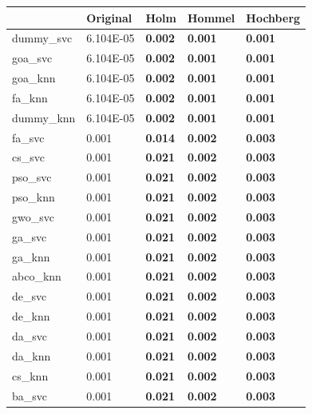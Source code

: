 \begin{table}[htb]
    \centering
    \begin{tabular}{lllll}
        \toprule
        {}         & Original  & Holm           & Hommel         & Hochberg       \\
        \midrule
        dummy\_svc & 6.104E-05 & \textbf{0.002} & \textbf{0.001} & \textbf{0.001} \\
        goa\_svc   & 6.104E-05 & \textbf{0.002} & \textbf{0.001} & \textbf{0.001} \\
        goa\_knn   & 6.104E-05 & \textbf{0.002} & \textbf{0.001} & \textbf{0.001} \\
        fa\_knn    & 6.104E-05 & \textbf{0.002} & \textbf{0.001} & \textbf{0.001} \\
        dummy\_knn & 6.104E-05 & \textbf{0.002} & \textbf{0.001} & \textbf{0.001} \\
        fa\_svc    & 0.001     & \textbf{0.014} & \textbf{0.002} & \textbf{0.003} \\
        cs\_svc    & 0.001     & \textbf{0.021} & \textbf{0.002} & \textbf{0.003} \\
        pso\_svc   & 0.001     & \textbf{0.021} & \textbf{0.002} & \textbf{0.003} \\
        pso\_knn   & 0.001     & \textbf{0.021} & \textbf{0.002} & \textbf{0.003} \\
        gwo\_svc   & 0.001     & \textbf{0.021} & \textbf{0.002} & \textbf{0.003} \\
        ga\_svc    & 0.001     & \textbf{0.021} & \textbf{0.002} & \textbf{0.003} \\
        ga\_knn    & 0.001     & \textbf{0.021} & \textbf{0.002} & \textbf{0.003} \\
        abco\_knn  & 0.001     & \textbf{0.021} & \textbf{0.002} & \textbf{0.003} \\
        de\_svc    & 0.001     & \textbf{0.021} & \textbf{0.002} & \textbf{0.003} \\
        de\_knn    & 0.001     & \textbf{0.021} & \textbf{0.002} & \textbf{0.003} \\
        da\_svc    & 0.001     & \textbf{0.021} & \textbf{0.002} & \textbf{0.003} \\
        da\_knn    & 0.001     & \textbf{0.021} & \textbf{0.002} & \textbf{0.003} \\
        cs\_knn    & 0.001     & \textbf{0.021} & \textbf{0.002} & \textbf{0.003} \\
        ba\_svc    & 0.001     & \textbf{0.021} & \textbf{0.002} & \textbf{0.003} \\

\end{tabular}
\end{table}
